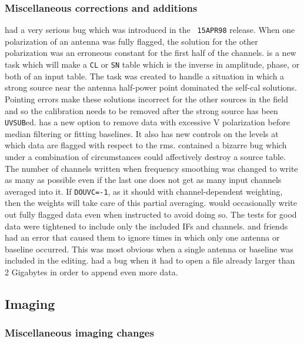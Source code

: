 \subsubsection{Miscellaneous corrections and additions}

\begin{description}
 had a very serious bug which was introduced in the {\tt
   15APR98} release.  When one polarization of an antenna was fully
   flagged, the solution for the other polarization was an erroneous
   constant for the first half of the channels.
 is a new task which will make a {\tt CL} or {\tt SN}
   table which is the inverse in amplitude, phase, or both of an input
   table.  The task was created to handle a situation in which a
   strong source near the antenna half-power point dominated the
   self-cal solutions.  Pointing errors make these solutions incorrect
   for the other sources in the field and so the calibration needs to
   be removed after the strong source has been {\tt UVSUB}ed.
 has a new option to remove data with excessive V
   polarization before median filtering or fitting baselines.  It also
   has new controls on the levels at which data are flagged with
   respect to the rms.
 contained a bizarre bug which under a combination of
   circumstances could affectively destroy a source table.  The number
   of channels written when frequency smoothing was changed to write
   as many as possible even if the last one does not get as many input
   channels averaged into it.  If {\tt DOUVC=-1}, as it should with
   channel-dependent weighting, then the weights will take care of
   this partial averaging.
 would occasionally write out fully flagged data even
   when instructed to avoid doing so.  The tests for good data were
   tightened to include only the included IFs and channels.
 and friends had an error that caused them to ignore
   times in which only one antenna or baseline occurred.  This was
   most obvious when a single antenna or baseline was included in the
   editing.
 had a bug when it had to open a file already larger
   than 2 Gigabytes in order to append even more data.
\end{description}

\subsection{Imaging}

\subsubsection{Miscellaneous imaging changes}

